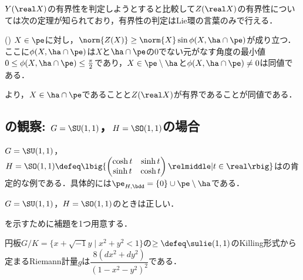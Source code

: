 $Y(\real X) $の有界性を判定しようとすると比較して$Z(\real X) $の有界性については次の定理が知られており，有界性の判定はLie環の言葉のみで行える．

\begin{thm}(\cite[Lemmma~5.4]{kob97})\label{thm:kob97}
  $X\in \pe$に対し，$\norm{Z(X)}\geq \norm{X} \sin\phi(X, \ha\cap\pe)$が成り立つ．ここに$\phi(X,\ha\cap \pe) $は$X$と$\ha\cap \pe$の0でない元がなす角度の最小値${0\leq \phi(X,\ha\cap \pe) \leq \frac{\pi}{2}} $であり，$X\in \pe\setminus \ha $と$ \phi(X,\ha\cap \pe)\neq 0 $は同値である．
\end{thm}

より，$X\in \ha\cap\pe $であることと$Z(\real X) $が有界であることが同値である．


\subsection{の観察: $G = \SU(1,1) $，$H = \SO(1,1) $の場合}

$G = \SU(1,1) $，$H = \SO(1,1) \defeq\lbig\{
\begin{pmatrix}
  \cosh t & \sinh t\\ \sinh t & \cosh t
\end{pmatrix}
\relmiddle| t\in \real \rbig\} $はの肯定的な例である．具体的には$\pe_{H,\bdd} = \{0\}\cup \pe\setminus\ha $である．

\begin{prop}\label{prop:prob-eg}
  $G = \SU(1,1) $，$H = \SO(1,1) $のときは正しい．
\end{prop}

を示すために補題を1つ用意する．
\begin{lem}\label{lem:riem-metric-su11}
  {\Poincare}円板${G/K =\{x+\sqrt{-1}y\mid  x^2 + y^2 < 1 \} }$の$\ge\defeq \sulie(1,1)$のKilling形式から定まるRiemann計量$g$は$ \dfrac{8(dx^2 + dy^2)}{(1 - x^2 - y^2)^2} $である．
\end{lem}

